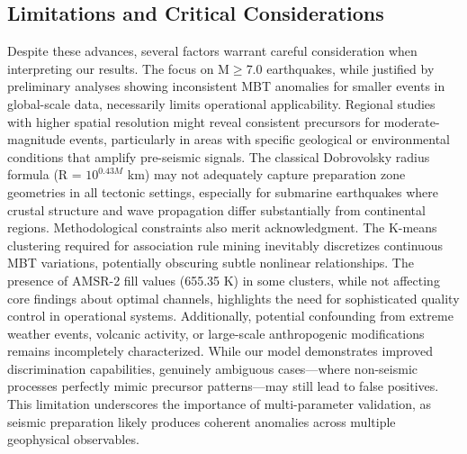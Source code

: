 \documentclass[fleqn,10pt]{wlscirep_mdpi_style}
\begin{document}
\subsection{Limitations and Critical Considerations}
Despite these advances, several factors warrant careful consideration when interpreting our results. The focus on M$\ge$7.0 earthquakes, while justified by preliminary analyses showing inconsistent MBT anomalies for smaller events in global-scale data, necessarily limits operational applicability. Regional studies with higher spatial resolution might reveal consistent precursors for moderate-magnitude events, particularly in areas with specific geological or environmental conditions that amplify pre-seismic signals. The classical Dobrovolsky radius formula (R = $10^{0.43M}$ km) may not adequately capture preparation zone geometries in all tectonic settings, especially for submarine earthquakes where crustal structure and wave propagation differ substantially from continental regions.
Methodological constraints also merit acknowledgment. The K-means clustering required for association rule mining inevitably discretizes continuous MBT variations, potentially obscuring subtle nonlinear relationships. The presence of AMSR-2 fill values (655.35 K) in some clusters, while not affecting core findings about optimal channels, highlights the need for sophisticated quality control in operational systems. Additionally, potential confounding from extreme weather events, volcanic activity, or large-scale anthropogenic modifications remains incompletely characterized. While our model demonstrates improved discrimination capabilities, genuinely ambiguous cases—where non-seismic processes perfectly mimic precursor patterns—may still lead to false positives. This limitation underscores the importance of multi-parameter validation, as seismic preparation likely produces coherent anomalies across multiple geophysical observables.
\end{document}
